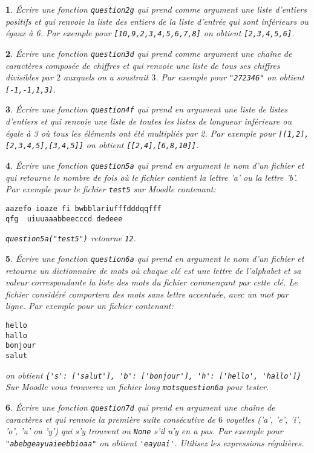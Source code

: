 \documentclass[10pt]{article}
\newtheorem{exi}{}
\newenvironment{exo}{\begin{exi}\em}{\end{exi}}
\begin{document}
\begin{exo}
    Écrire une fonction {\tt question2g} qui prend comme argument une liste d'entiers positifs et qui renvoie la liste des entiers de la liste d'entrée qui sont
inférieurs ou égaux à 6. Par exemple pour \verb+[10,9,2,3,4,5,6,7,8]+
on obtient \verb+[2,3,4,5,6]+.
\end{exo}
\begin{exo}
    Écrire une fonction {\tt question3d} qui prend comme argument une chaîne de
caractères composée de chiffres
et qui renvoie une liste de tous ses chiffres divisibles par $2$
auxquels on a soustrait $3$. Par
exemple pour \verb+"272346"+ on obtient \verb+[-1,-1,1,3]+.
\end{exo}
\begin{exo}
    Écrire une fonction {\tt question4f} qui prend en argument une liste de listes d'entiers et qui renvoie une liste de toutes les listes
de longueur inférieure ou égale à 3 où tous les éléments ont été multipliés par 2. Par exemple pour \verb+[[1,2],[2,3,4,5],[3,4,5]]+ on obtient \verb+[[2,4],[6,8,10]]+.
\end{exo}
\begin{exo}
    Écrire une fonction {\tt question5a} qui prend en argument le nom d'un fichier et qui retourne le nombre de fois où le fichier contient la lettre 'a' ou la
lettre 'b'.
Par exemple pour le fichier \verb+test5+ sur Moodle contenant: 
\begin{verbatim} 
aazefo ioaze fi bwbblariufffdddqqfff
qfg  uiuuaaabbeecccd dedeee
\end{verbatim} 
\verb+question5a("test5")+ retourne \verb+12+.
\end{exo}
\begin{exo}
    Écrire une fonction \verb+question6a+ qui prend en argument le nom d'un fichier
et retourne un dictionnaire de mots où chaque clé est une lettre de
l'alphabet et sa valeur correspondante la liste des mots du fichier commençant
par cette clé. Le fichier considéré comportera des mots 
sans lettre accentuée, avec un mot par ligne. Par exemple pour un fichier
contenant:
\begin{verbatim}
hello
hallo
bonjour
salut
\end{verbatim}
on obtient \verb+{'s': ['salut'], 'b': ['bonjour'], 'h': ['hello', 'hallo']}+\\
Sur Moodle vous trouverez un fichier long \verb+motsquestion6a+ pour tester.
\end{exo}
\begin{exo}
    Écrire une fonction {\tt question7d}
qui prend en argument une chaîne de caractères et qui renvoie
la première suite consécutive de $6$ voyelles ('a', 'e', 'i', 'o', 'u' ou 'y')
qui s'y trouvent ou \verb+None+
s'il n'y en a pas.
Par exemple pour \verb+"abebgeayuaieebbioaa"+ on obtient
\verb+'eayuai'+. Utilisez les expressions régulières.
\end{exo}
\end{document}
